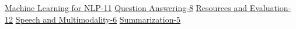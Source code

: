 \begin{SingleTrackSchedule}
\hyperref[parallel-session-10B-trackE]{Machine Learning for NLP-11} \hfill \emph{\TrackELoc} \newline
\hyperref[parallel-session-10B-trackF]{Question Answering-8} \hfill \emph{\TrackFLoc} \newline
\hyperref[parallel-session-10B-trackG]{Resources and Evaluation-12} \hfill \emph{\TrackGLoc} \newline
\hyperref[parallel-session-10B-trackH]{Speech and Multimodality-6} \hfill \emph{\TrackHLoc} \newline
\hyperref[parallel-session-10B-trackI]{Summarization-5} \hfill \emph{\TrackILoc} \newline
\\
\end{SingleTrackSchedule}
